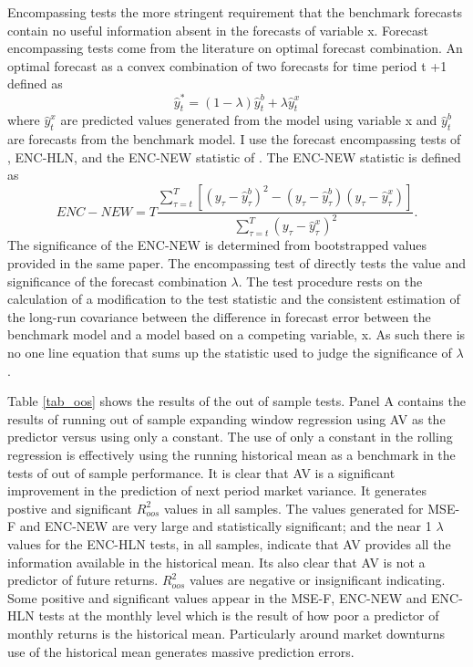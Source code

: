 Encompassing tests the more stringent requirement that the benchmark forecasts contain no useful information absent in the forecasts of variable x. Forecast encompassing tests come from the literature on optimal forecast combination. \citep{Chong1986,Fair1990} An optimal forecast as a convex combination of two forecasts for time period t +1 defined as
\begin{equation} \label{eq:forecast_comb}
\hat y^{*}_{t} = (1-\lambda)\hat y^{b}_{t} + \lambda \hat y^{x}_{t}
\end{equation}
where $\hat y^{x}_{t}$ are predicted values generated from the model using variable x and $\hat y^{b}_{t}$ are forecasts from the benchmark model. I use the forecast encompassing tests of \citet{harvey_tests_1998}, ENC-HLN, and the ENC-NEW statistic of \cite{clark_tests_2001}.
The ENC-NEW statistic is defined as
\begin{equation}
ENC-NEW = T \frac{\sum_{\tau = t}^{T}{\left[(y_{\tau} - \hat{y}^{b}_{\tau})^{2}-(y_{\tau} - \hat{y}^{b}_{\tau})(y_{\tau} - \hat{y}^{x}_{\tau})\right]}}{\sum_{\tau = t}^{T}(y_{\tau} - \hat{y}^{x}_{\tau})^{2}}.
\end{equation}
The significance of the ENC-NEW is determined from bootstrapped values provided in the same paper.
The encompassing test of \citet{harvey_tests_1998} directly tests the value and significance of the forecast combination $\lambda$. The test procedure rests on the calculation of a modification to the \citet{Diebold1995} test statistic and the consistent estimation of the long-run covariance between the difference in forecast error between the benchmark model and a model based on a competing variable, x. As such there is no one line equation that sums up the statistic used to judge the significance of $\lambda$.

Table \ref{tab_oos} shows the results of the out of sample tests. Panel A contains the results of running out of sample expanding window regression using AV as the predictor versus using only a constant. The use of only a constant in the rolling regression is effectively using the running historical mean as a benchmark in the tests of out of sample performance. It is clear that AV is a significant improvement in the prediction of next period market variance. It generates postive and significant $R^{2}_{oos}$ values in all samples. The values generated for MSE-F and ENC-NEW are very large and statistically significant; and the near 1 $\lambda$ values for the ENC-HLN tests, in all samples, indicate that AV provides all the information available in the historical mean. Its also clear that AV is not a predictor of future returns. $R^{2}_{oos}$ values are negative or insignificant indicating. Some positive and significant values appear in the MSE-F, ENC-NEW and ENC-HLN tests at the monthly level which is the result of how poor a predictor of monthly returns is the historical mean. Particularly around market downturns use of the historical mean generates massive prediction errors.

